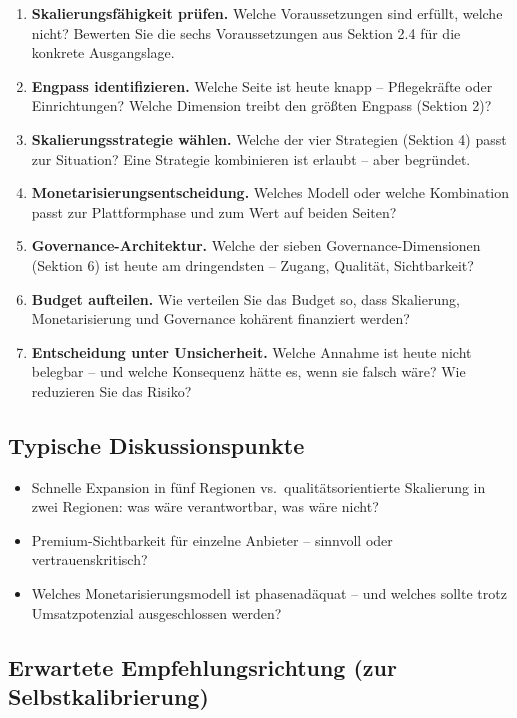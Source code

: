 \documentclass[11pt,a4paper,oneside]{article}
\begin{document}
\begin{enumerate}
  \item \textbf{Skalierungsfähigkeit prüfen.} Welche Voraussetzungen sind erfüllt, welche nicht? Bewerten Sie die sechs Voraussetzungen aus Sektion 2.4 für die konkrete Ausgangslage.
  \item \textbf{Engpass identifizieren.} Welche Seite ist heute knapp -- Pflegekräfte oder Einrichtungen? Welche Dimension treibt den größten Engpass (Sektion 2)?
  \item \textbf{Skalierungsstrategie wählen.} Welche der vier Strategien (Sektion 4) passt zur Situation? Eine Strategie kombinieren ist erlaubt -- aber begründet.
  \item \textbf{Monetarisierungsentscheidung.} Welches Modell oder welche Kombination passt zur Plattformphase und zum Wert auf beiden Seiten?
  \item \textbf{Governance-Architektur.} Welche der sieben Governance-Dimensionen (Sektion 6) ist heute am dringendsten -- Zugang, Qualität, Sichtbarkeit?
  \item \textbf{Budget aufteilen.} Wie verteilen Sie das Budget so, dass Skalierung, Monetarisierung und Governance kohärent finanziert werden?
  \item \textbf{Entscheidung unter Unsicherheit.} Welche Annahme ist heute nicht belegbar -- und welche Konsequenz hätte es, wenn sie falsch wäre? Wie reduzieren Sie das Risiko?
\end{enumerate}

\subsection{Typische Diskussionspunkte}

\begin{itemize}
  \item Schnelle Expansion in fünf Regionen vs.\ qualitätsorientierte Skalierung in zwei Regionen: was wäre verantwortbar, was wäre nicht?
  \item Premium-Sichtbarkeit für einzelne Anbieter -- sinnvoll oder vertrauenskritisch?
  \item Welches Monetarisierungsmodell ist phasenadäquat -- und welches sollte trotz Umsatzpotenzial ausgeschlossen werden?
\end{itemize}

\subsection{Erwartete Empfehlungsrichtung (zur Selbstkalibrierung)}
\end{document}
